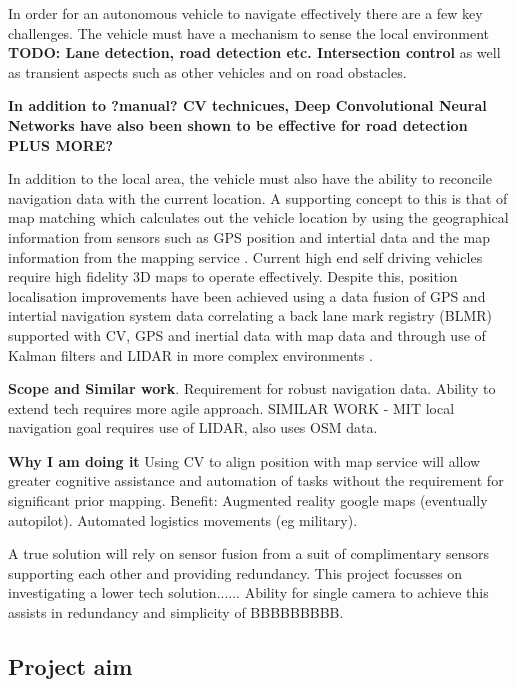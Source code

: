 \documentclass[]{aiaa-tc}%
\begin{document}
In order for an autonomous vehicle to navigate effectively there are a few key challenges. The vehicle must have a mechanism to sense the local environment \textbf{TODO: Lane detection, road detection etc. Intersection control} as well as transient aspects such as other vehicles and on road obstacles.

\textbf{In addition to ?manual? CV technicues, Deep Convolutional Neural Networks have also been shown to be effective for road detection \citep{deepRoadSegmentation} PLUS MORE? }


In addition to the local area, the vehicle must also have the ability to reconcile navigation data with the current location. A supporting concept to this is that of map matching which calculates out the vehicle location by using the geographical information from sensors such as GPS position and intertial data and the map information from the mapping service \citep{keyTechSelfDriving}. Current high end self driving vehicles require high fidelity 3D maps to operate effectively. Despite this, position localisation improvements have been achieved using a data fusion of GPS and intertial navigation system data \citep{gpsInsFusion} correlating a back lane mark registry (BLMR) supported with CV, GPS and inertial data with map data \citep{lowCostSensorNav} and through use of Kalman filters and LIDAR in more complex environments \citep{robotLIDARSLAM}.

\textbf{Scope and Similar work}. Requirement for robust navigation data. Ability to extend tech requires more agile approach. SIMILAR WORK - MIT local navigation goal \citep{mitLocalNavDriving} requires use of LIDAR, also uses OSM data. 

\textbf{Why I am doing it }
Using CV to align position with map service will allow greater cognitive assistance and automation of tasks without the requirement for significant prior mapping. Benefit: Augmented reality google maps (eventually autopilot). Automated logistics movements (eg military).

A true solution will rely on sensor fusion from a suit of complimentary sensors supporting each other and providing redundancy. This project focusses on investigating a lower tech solution...... Ability for single camera to achieve this assists in redundancy and simplicity of BBBBBBBBB.

\subsection{Project aim}
\end{document}
